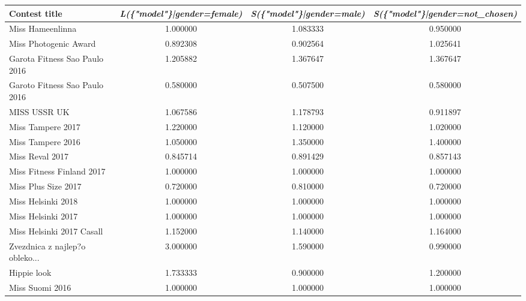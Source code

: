\documentclass[english]{tktltiki}
\begin{document}
\begin{table}
    \centering
    \begin{adjustbox}{width=1\textwidth}
    \begin{tabular}{lccc}
        \toprule
        \textbf{Contest title} & \textbf{\emph{L(\{"model"\}|gender=female)}} & \textbf{\emph{S(\{"model"\}|gender=male)}} & \textbf{\emph{S(\{"model"\}|gender=not\_chosen)}} \\
        \midrule
                                  Miss Hameenlinna &  1.000000 &  1.083333 &    0.950000 \\
                             Miss Photogenic Award &  0.892308 &  0.902564 &    1.025641 \\
                     Garota Fitness Sao Paulo 2016 &  1.205882 &  1.367647 &    1.367647 \\
                     Garoto Fitness Sao Paulo 2016 &  0.580000 &  0.507500 &    0.580000 \\
                                      MISS USSR UK &  1.067586 &  1.178793 &    0.911897 \\
                                 Miss Tampere 2017 &  1.220000 &  1.120000 &    1.020000 \\
                                 Miss Tampere 2016 &  1.050000 &  1.350000 &    1.400000 \\
                                   Miss Reval 2017 &  0.845714 &  0.891429 &    0.857143 \\
                         Miss Fitness Finland 2017 &  1.000000 &  1.000000 &    1.000000 \\
                               Miss Plus Size 2017 &  0.720000 &  0.810000 &    0.720000 \\
                                Miss Helsinki 2018 &  1.000000 &  1.000000 &    1.000000 \\
                                Miss Helsinki 2017 &  1.000000 &  1.000000 &    1.000000 \\
                         Miss Helsinki 2017 Casall &  1.152000 &  1.140000 &    1.164000 \\
                Zvezdnica z najlep?o obleko... &  3.000000 &  1.590000 &    0.990000 \\
                                       Hippie look &  1.733333 &  0.900000 &    1.200000 \\
                                   Miss Suomi 2016 &  1.000000 &  1.000000 &    1.000000 \\

\end{tabular}
\end{adjustbox}
\end{table}
\end{document}
